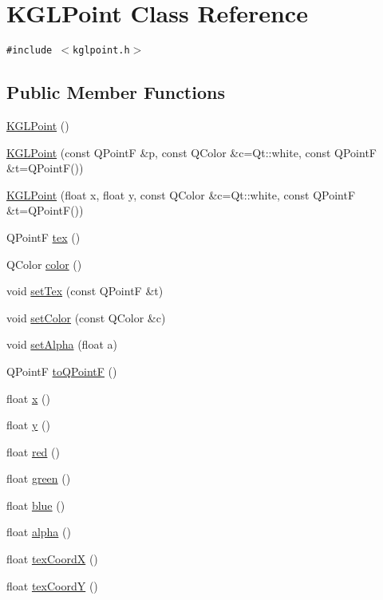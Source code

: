 \hypertarget{class_k_g_l_point}{
\section{KGLPoint Class Reference}
\label{class_k_g_l_point}
}
{\tt \#include $<$kglpoint.h$>$}

\subsection*{Public Member Functions}
\begin{CompactItemize}
\item 
\hyperlink{class_k_g_l_point_ec90027724e47b130bfa7baa537c3525}{KGLPoint} ()
\item 
\hyperlink{class_k_g_l_point_f07f3a2263c4855e244e07b4008aed3b}{KGLPoint} (const QPointF \&p, const QColor \&c=Qt::white, const QPointF \&t=QPointF())
\item 
\hyperlink{class_k_g_l_point_0c51439bef1f4a13b842fe374d26f67d}{KGLPoint} (float x, float y, const QColor \&c=Qt::white, const QPointF \&t=QPointF())
\item 
QPointF \hyperlink{class_k_g_l_point_75e4837c809e80d80d93df8009a79b39}{tex} ()
\item 
QColor \hyperlink{class_k_g_l_point_12056ee2968beabf1d8cbc1f78fb925d}{color} ()
\item 
void \hyperlink{class_k_g_l_point_2670bdba8e0274cacd1034fa048dbf64}{setTex} (const QPointF \&t)
\item 
void \hyperlink{class_k_g_l_point_b03b0a3565b23a9dc914e877ccde23e9}{setColor} (const QColor \&c)
\item 
void \hyperlink{class_k_g_l_point_8466138efb12c13c8866ea8354f3f839}{setAlpha} (float a)
\item 
QPointF \hyperlink{class_k_g_l_point_91024421e8cca6c1f9752eea9e0f7c91}{toQPointF} ()
\item 
float \hyperlink{class_k_g_l_point_336b4291f8554fdfc29e2c8e37290374}{x} ()
\item 
float \hyperlink{class_k_g_l_point_f13e00b27b57545e193c77f98eed8763}{y} ()
\item 
float \hyperlink{class_k_g_l_point_962653ad291ec2e50e079312963ead48}{red} ()
\item 
float \hyperlink{class_k_g_l_point_5c879ad55c4acfde4a8749391852c7e5}{green} ()
\item 
float \hyperlink{class_k_g_l_point_36413238e5278cf10a8adf0775c646e8}{blue} ()
\item 
float \hyperlink{class_k_g_l_point_638b9d22b3bc3fd7d18d073de199d6f4}{alpha} ()
\item 
float \hyperlink{class_k_g_l_point_997327431417659d02cae5f3c0c91297}{texCoordX} ()
\item 
float \hyperlink{class_k_g_l_point_b9202127decfa0165dc49903a28e6ae9}{texCoordY} ()
\end{CompactItemize}


